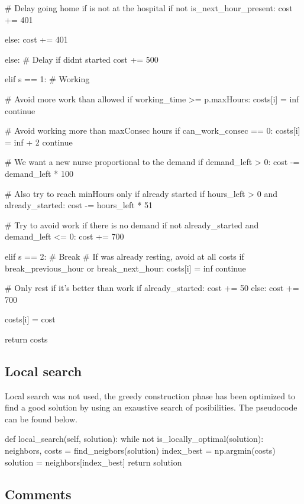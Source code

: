 \documentclass[12pt,a4paper]{article}
\begin{document}
\begin{pycode}
					# Delay going home if is not at the hospital
					if not is_next_hour_present:
						cost += 401

					else:
						cost += 401

				else:
					# Delay if didnt started
					cost += 500

			elif s == 1: # Working

				# Avoid more work than allowed
				if working_time >= p.maxHours:
					costs[i] = inf
					continue

				# Avoid working more than maxConsec hours
				if can_work_consec == 0:
					costs[i] = inf + 2
					continue

				# We want a new nurse proportional to the demand
				if demand_left > 0:
					cost -= demand_left * 100

				# Also try to reach minHours only if already started
				if hours_left > 0 and already_started:
					cost -= hours_left * 51

				# Try to avoid work if there is no demand
				if not already_started and demand_left <= 0:
					cost += 700

			elif s == 2: # Break
				# If was already resting, avoid at all costs
				if break_previous_hour or break_next_hour:
					costs[i] = inf
					continue

				# Only rest if it's better than work
				if already_started:
					cost += 50
				else:
					cost += 700

			costs[i] = cost

		return costs
\end{pycode}


\subsection{Local search}
%
Local search was not used, the greedy construction phase has been optimized to 
find a good solution by using an exaustive search of posibilities. The 
pseudocode can be found below.
%
\begin{pycode}
def local_search(self, solution):
	while not is_locally_optimal(solution):
		neighbors, costs = find_neigbors(solution)
		index_best = np.argmin(costs)
		solution = neighbors[index_best]
	return solution
\end{pycode}
%

\subsection{Comments}
\end{document}

